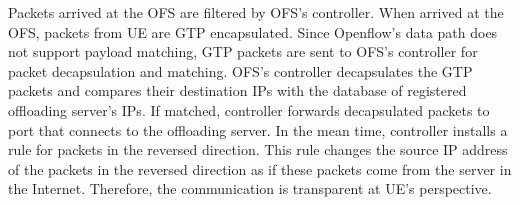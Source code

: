 Packets arrived at the OFS are filtered by OFS's controller.
When arrived at the OFS, packets from UE are GTP 
encapsulated. Since Openflow's data path does not support payload 
matching, GTP packets are sent to OFS's controller for packet 
decapsulation and matching. OFS's controller 
decapsulates the GTP packets and compares their destination IPs 
with the database of registered offloading server's 
IPs. If matched, controller forwards decapsulated packets 
to port that connects to the offloading server. 
In the mean time, controller installs a 
rule for packets in the reversed direction. This 
rule changes the source IP address of the packets 
in the reversed direction as if these packets 
come from the server in the Internet. Therefore, the 
communication is transparent at UE's perspective.\\


















